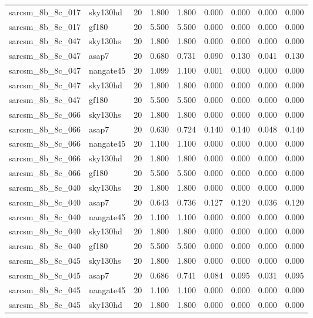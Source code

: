 \begin{tabular}{llrrrrrrr}
sarcsm\_8b\_8c\_017 & sky130hd & 20 & 1.800 & 1.800 & 0.000 & 0.000 & 0.000 & 0.000 \\
sarcsm\_8b\_8c\_017 & gf180 & 20 & 5.500 & 5.500 & 0.000 & 0.000 & 0.000 & 0.000 \\
sarcsm\_8b\_8c\_047 & sky130hs & 20 & 1.800 & 1.800 & 0.000 & 0.000 & 0.000 & 0.000 \\
sarcsm\_8b\_8c\_047 & asap7 & 20 & 0.680 & 0.731 & 0.090 & 0.130 & 0.041 & 0.130 \\
sarcsm\_8b\_8c\_047 & nangate45 & 20 & 1.099 & 1.100 & 0.001 & 0.000 & 0.000 & 0.000 \\
sarcsm\_8b\_8c\_047 & sky130hd & 20 & 1.800 & 1.800 & 0.000 & 0.000 & 0.000 & 0.000 \\
sarcsm\_8b\_8c\_047 & gf180 & 20 & 5.500 & 5.500 & 0.000 & 0.000 & 0.000 & 0.000 \\
sarcsm\_8b\_8c\_066 & sky130hs & 20 & 1.800 & 1.800 & 0.000 & 0.000 & 0.000 & 0.000 \\
sarcsm\_8b\_8c\_066 & asap7 & 20 & 0.630 & 0.724 & 0.140 & 0.140 & 0.048 & 0.140 \\
sarcsm\_8b\_8c\_066 & nangate45 & 20 & 1.100 & 1.100 & 0.000 & 0.000 & 0.000 & 0.000 \\
sarcsm\_8b\_8c\_066 & sky130hd & 20 & 1.800 & 1.800 & 0.000 & 0.000 & 0.000 & 0.000 \\
sarcsm\_8b\_8c\_066 & gf180 & 20 & 5.500 & 5.500 & 0.000 & 0.000 & 0.000 & 0.000 \\
sarcsm\_8b\_8c\_040 & sky130hs & 20 & 1.800 & 1.800 & 0.000 & 0.000 & 0.000 & 0.000 \\
sarcsm\_8b\_8c\_040 & asap7 & 20 & 0.643 & 0.736 & 0.127 & 0.120 & 0.036 & 0.120 \\
sarcsm\_8b\_8c\_040 & nangate45 & 20 & 1.100 & 1.100 & 0.000 & 0.000 & 0.000 & 0.000 \\
sarcsm\_8b\_8c\_040 & sky130hd & 20 & 1.800 & 1.800 & 0.000 & 0.000 & 0.000 & 0.000 \\
sarcsm\_8b\_8c\_040 & gf180 & 20 & 5.500 & 5.500 & 0.000 & 0.000 & 0.000 & 0.000 \\
sarcsm\_8b\_8c\_045 & sky130hs & 20 & 1.800 & 1.800 & 0.000 & 0.000 & 0.000 & 0.000 \\
sarcsm\_8b\_8c\_045 & asap7 & 20 & 0.686 & 0.741 & 0.084 & 0.095 & 0.031 & 0.095 \\
sarcsm\_8b\_8c\_045 & nangate45 & 20 & 1.100 & 1.100 & 0.000 & 0.000 & 0.000 & 0.000 \\
sarcsm\_8b\_8c\_045 & sky130hd & 20 & 1.800 & 1.800 & 0.000 & 0.000 & 0.000 & 0.000 \\

\end{tabular}
